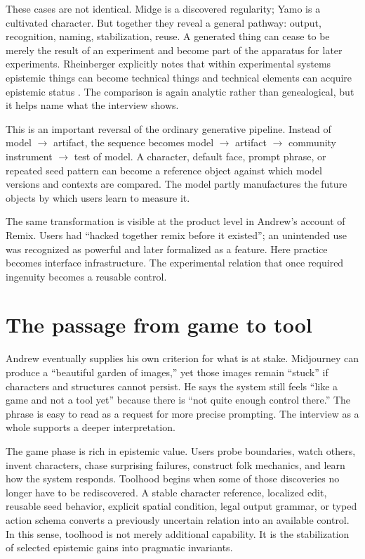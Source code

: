 \documentclass[11pt]{article}
\begin{document}
These cases are not identical. Midge is a discovered regularity; Yamo is a cultivated character. But together they reveal a general pathway: output, recognition, naming, stabilization, reuse. A generated thing can cease to be merely the result of an experiment and become part of the apparatus for later experiments. Rheinberger explicitly notes that within experimental systems epistemic things can become technical things and technical elements can acquire epistemic status \citep{rheinberger2004experimental}. The comparison is again analytic rather than genealogical, but it helps name what the interview shows.

This is an important reversal of the ordinary generative pipeline. Instead of model $\rightarrow$ artifact, the sequence becomes model $\rightarrow$ artifact $\rightarrow$ community instrument $\rightarrow$ test of model. A character, default face, prompt phrase, or repeated seed pattern can become a reference object against which model versions and contexts are compared. The model partly manufactures the future objects by which users learn to measure it.

The same transformation is visible at the product level in Andrew's account of Remix. Users had ``hacked together remix before it existed''; an unintended use was recognized as powerful and later formalized as a feature. Here practice becomes interface infrastructure. The experimental relation that once required ingenuity becomes a reusable control.

\section{The passage from game to tool}
Andrew eventually supplies his own criterion for what is at stake. Midjourney can produce a ``beautiful garden of images,'' yet those images remain ``stuck'' if characters and structures cannot persist. He says the system still feels ``like a game and not a tool yet'' because there is ``not quite enough control there.'' The phrase is easy to read as a request for more precise prompting. The interview as a whole supports a deeper interpretation.

The game phase is rich in epistemic value. Users probe boundaries, watch others, invent characters, chase surprising failures, construct folk mechanics, and learn how the system responds. Toolhood begins when some of those discoveries no longer have to be rediscovered. A stable character reference, localized edit, reusable seed behavior, explicit spatial condition, legal output grammar, or typed action schema converts a previously uncertain relation into an available control. In this sense, toolhood is not merely additional capability. It is the stabilization of selected epistemic gains into pragmatic invariants.
\end{document}
